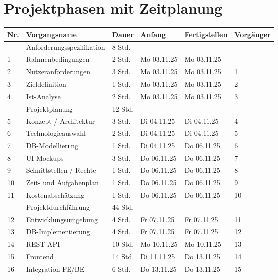 \documentclass[11pt,a4paper]{report}
\begin{document}
\section{Projektphasen mit Zeitplanung}

\begin{table}[h!]
\centering
{}
\begin{tabular}{|p{0.5cm}|p{5.5cm}|p{1.6cm}|p{2.2cm}|p{2.2cm}|p{2cm}|}
\hline
\rowcolor{EDAGgrau}
\rowcolor{EDAGgrau}\textbf{Nr.} & \textbf{Vorgangsname} & \textbf{Dauer} & \textbf{Anfang} & \textbf{Fertigstellen} & \textbf{Vorgänger} \\
\hline
 & Anforderungsspezifikation & 8 Std. & -- & -- & -- \\
1 & Rahmenbedingungen & 2 Std. & Mo 03.11.25 & Mo 03.11.25 & -- \\
2 & Nutzeranforderungen & 3 Std. & Mo 03.11.25 & Mo 03.11.25 & 1 \\
3 & Zieldefinition & 1 Std. & Mo 03.11.25 & Mo 03.11.25 & 2 \\
4 & Ist-Analyse & 2 Std. & Mo 03.11.25 & Mo 03.11.25 & 3 \\
\hline
 & Projektplanung & 12 Std. & -- & --  & -- \\
5 & Konzept / Architektur & 3 Std. & Di 04.11.25 & Di 04.11.25 & 4 \\
6 & Technologieauswahl & 2 Std. & Di 04.11.25 & Di 04.11.25 & 5 \\
7 & DB-Modellierung & 1 Std. & Di 04.11.25 & Do 06.11.25 & 6 \\
8 & UI-Mockups & 3 Std. & Do 06.11.25 & Do 06.11.25 & 7 \\
9 & Schnittstellen / Rechte & 1 Std. & Do 06.11.25 & Do 06.11.25 & 8 \\
10 & Zeit- und Aufgabenplan & 1 Std. & Do 06.11.25 & Do 06.11.25 & 9 \\
11 & Kostenabschätzung & 1 Std. & Do 06.11.25 & Do 06.11.25 & 10 \\
\hline
 & Projektdurchführung & 44 Std. & --  & --  & -- \\
12 & Entwicklungsumgebung & 4 Std. & Fr 07.11.25 & Fr 07.11.25 & 11 \\
13 & DB-Implementierung & 4 Std. & Fr 07.11.25 & Fr 07.11.25 & 12 \\
14 & REST-API & 10 Std. & Mo 10.11.25 & Mo 10.11.25 & 13 \\
15 & Frontend & 14 Std. & Di 11.11.25 & Do 13.11.25 & 14 \\
16 & Integration FE/BE & 6 Std. & Do 13.11.25 & Do 13.11.25 & 15 \\

\end{tabular}
\end{table}
\end{document}
